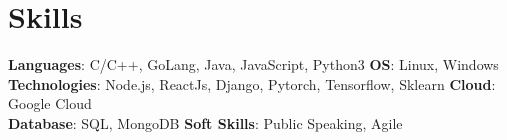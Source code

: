 \section{Skills}
    \textbf{Languages}{: C/C++, GoLang, Java, JavaScript, Python3 }
    \hfill
    \textbf{OS}{: Linux, Windows}
     \\
    \textbf{Technologies}{: Node.js, ReactJs, Django, Pytorch, Tensorflow, Sklearn}
    \hfill
    \textbf{Cloud}{: Google Cloud}
    \\
    \textbf{Database}{: SQL, MongoDB}
    \hfill
    \textbf{Soft Skills}{: Public Speaking, Agile}

